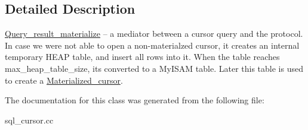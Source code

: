 \subsection{Detailed Description}
\mbox{\hyperlink{classQuery__result__materialize}{Query\+\_\+result\+\_\+materialize}} -- a mediator between a cursor query and the protocol. In case we were not able to open a non-\/materialzed cursor, it creates an internal temporary H\+E\+AP table, and insert all rows into it. When the table reaches max\+\_\+heap\+\_\+table\+\_\+size, it\textquotesingle{}s converted to a My\+I\+S\+AM table. Later this table is used to create a \mbox{\hyperlink{classMaterialized__cursor}{Materialized\+\_\+cursor}}. 

The documentation for this class was generated from the following file\+:\begin{DoxyCompactItemize}
\item 
sql\+\_\+cursor.\+cc\end{DoxyCompactItemize}
